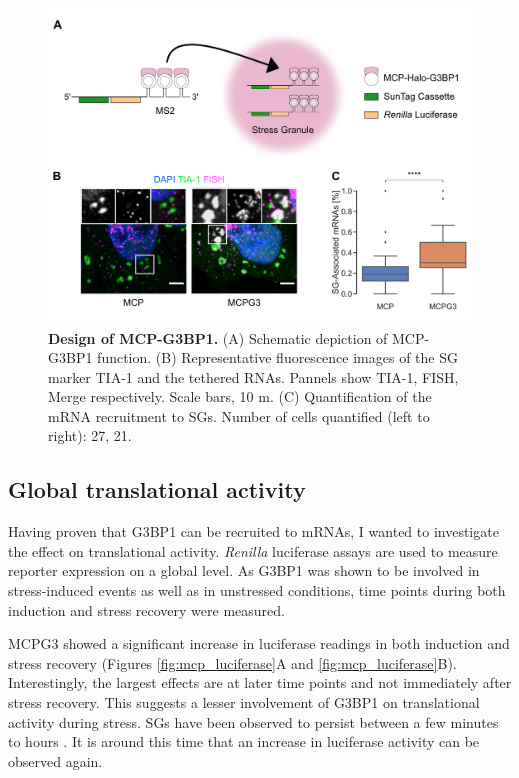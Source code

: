 \begin{figure}[h]
    \centering
    \includegraphics[width=\linewidth]{images/figure2}
    \caption{\textbf{Design of MCP-G3BP1.}
        (A) Schematic depiction of MCP-G3BP1 function.
        (B) Representative fluorescence images of the SG marker
            TIA-1 and the tethered RNAs.
            Pannels show TIA-1, FISH, Merge respectively.
            Scale bars, 10 \textmu m.
        (C) Quantification of the mRNA recruitment to SGs.
            Number of cells quantified (left to right): 27, 21. 
    }
    \label{fig:mcp_images}
\end{figure}

\subsection{Global translational activity} \label{mcp_luciferase}

Having proven that G3BP1 can be recruited to mRNAs,
    I wanted to investigate the effect on translational activity.
\textit{Renilla} luciferase assays are used to measure reporter expression on a global level.
As G3BP1 was shown to be involved in stress-induced events as well as in unstressed conditions,
    time points during both induction and stress recovery were measured.

MCPG3 showed a significant increase in luciferase readings in both induction and stress recovery (Figures \ref{fig:mcp_luciferase}A and \ref{fig:mcp_luciferase}B).
Interestingly, the largest effects are at later time points and not immediately after stress recovery.
This suggests a lesser involvement of G3BP1 on translational activity during stress.
SGs have been observed to persist between a few minutes to hours \cite{chen_relationships_2017}.
It is around this time that an increase in luciferase activity can be observed again.

